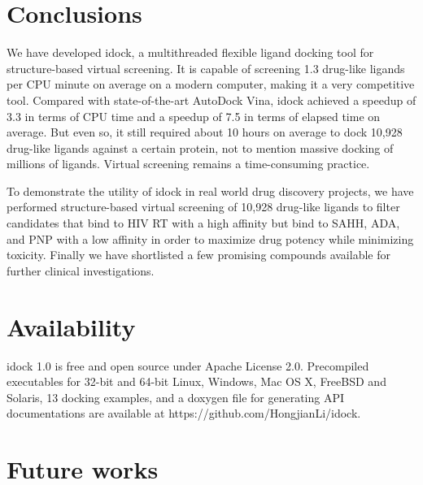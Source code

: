 \section{Conclusions}

We have developed idock, a multithreaded flexible ligand docking tool for structure-based virtual screening. It is capable of screening 1.3 drug-like ligands per CPU minute on average on a modern computer, making it a very competitive tool. Compared with state-of-the-art AutoDock Vina, idock achieved a speedup of 3.3 in terms of CPU time and a speedup of 7.5 in terms of elapsed time on average. But even so, it still required about 10 hours on average to dock 10,928 drug-like ligands against a certain protein, not to mention massive docking of millions of ligands. Virtual screening remains a time-consuming practice.

To demonstrate the utility of idock in real world drug discovery projects, we have performed structure-based virtual screening of 10,928 drug-like ligands to filter candidates that bind to HIV RT with a high affinity but bind to SAHH, ADA, and PNP with a low affinity in order to maximize drug potency while minimizing toxicity. Finally we have shortlisted a few promising compounds available for further clinical investigations.

\section{Availability}

idock 1.0 is free and open source under Apache License 2.0. Precompiled executables for 32-bit and 64-bit Linux, Windows, Mac OS X, FreeBSD and Solaris, 13 docking examples, and a doxygen file for generating API documentations are available at https://github.com/HongjianLi/idock.

\section{Future works}

